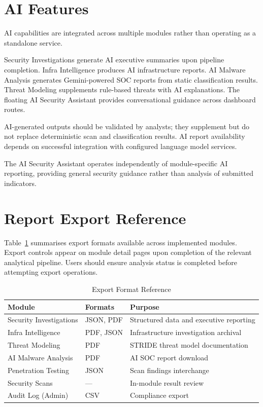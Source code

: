 \section{AI Features}

AI capabilities are integrated across multiple modules rather than operating as a standalone service.

Security Investigations generate AI executive summaries upon pipeline completion. Infra Intelligence produces AI infrastructure reports. AI Malware Analysis generates Gemini-powered SOC reports from static classification results. Threat Modeling supplements rule-based threats with AI explanations. The floating AI Security Assistant provides conversational guidance across dashboard routes.

AI-generated outputs should be validated by analysts; they supplement but do not replace deterministic scan and classification results. AI report availability depends on successful integration with configured language model services.

The AI Security Assistant operates independently of module-specific AI reporting, providing general security guidance rather than analysis of submitted indicators.

\section{Report Export Reference}

Table~\ref{tab:ch6_export_format_reference} summarises export formats available across implemented modules. Export controls appear on module detail pages upon completion of the relevant analytical pipeline. Users should ensure analysis status is completed before attempting export operations.

\begin{table}[H]
\centering
\caption{Export Format Reference}
\label{tab:ch6_export_format_reference}
\begin{tabular}{lll}
\toprule
\textbf{Module} & \textbf{Formats} & \textbf{Purpose} \\
\midrule
Security Investigations & JSON, PDF & Structured data and executive reporting \\
Infra Intelligence & PDF, JSON & Infrastructure investigation archival \\
Threat Modeling & PDF & STRIDE threat model documentation \\
AI Malware Analysis & PDF & AI SOC report download \\
Penetration Testing & JSON & Scan findings interchange \\
Security Scans & --- & In-module result review \\
Audit Log (Admin) & CSV & Compliance export \\
\bottomrule
\end{tabular}
\end{table}

